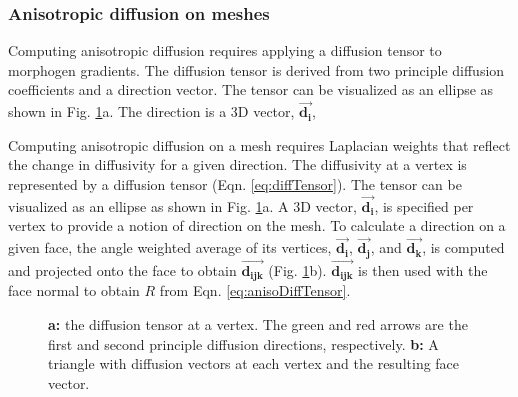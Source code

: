 \subsubsection*{Anisotropic diffusion on meshes}

Computing anisotropic diffusion requires applying a diffusion tensor to morphogen gradients. The diffusion tensor is derived from two principle diffusion coefficients and a direction vector. The tensor can be visualized as an ellipse as shown in Fig. \ref{fig:anisoMesh}a. The direction is a 3D vector, $\boldsymbol{\vec{d_i}}$,

Computing anisotropic diffusion on a mesh requires Laplacian weights that reflect the change in diffusivity for a given direction. The diffusivity at a vertex is represented by a diffusion tensor (Eqn. \ref{eq:diffTensor}). The tensor can be visualized as an ellipse as shown in Fig. \ref{fig:anisoMesh}a. A 3D vector, $\boldsymbol{\vec{d_i}}$, is specified per vertex to provide a notion of direction on the mesh. To calculate a direction on a given face, the angle weighted average of its vertices, $\boldsymbol{\vec{d_i}}$, $\boldsymbol{\vec{d_j}}$, and $\boldsymbol{\vec{d_k}}$, is computed and projected onto the face to obtain $\boldsymbol{\vec{d_{ijk}}}$ (Fig. \ref{fig:anisoMesh}b). $\boldsymbol{\vec{d_{ijk}}}$ is then used with the face normal to obtain $R$ from Eqn. \ref{eq:anisoDiffTensor}.

\begin{figure}[H]
	\centering
	\caption{\textbf{a:} the diffusion tensor at a vertex. The green and red arrows are the first and second principle diffusion directions, respectively. \textbf{b:} A triangle with diffusion vectors at each vertex and the resulting face vector.}
	\label{fig:anisoMesh}
\end{figure}



% 


